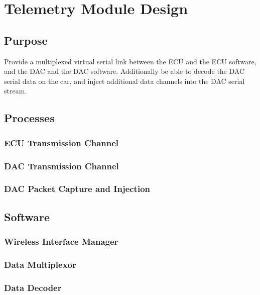 \section{Telemetry Module Design\label{sec:Telemetry-Module-Design}}


\subsection{Purpose}

Provide a multiplexed virtual serial link between the ECU and the
ECU software, and the DAC and the DAC software. Additionally be able
to decode the DAC serial data on the car, and inject additional data
channels into the DAC serial stream.


\subsection{Processes}


\subsubsection{ECU Transmission Channel}


\subsubsection{DAC Transmission Channel}


\subsubsection{DAC Packet Capture and Injection}


\subsection{Software}


\subsubsection{Wireless Interface Manager }


\subsubsection{Data Multiplexor}


\subsubsection{Data Decoder }



